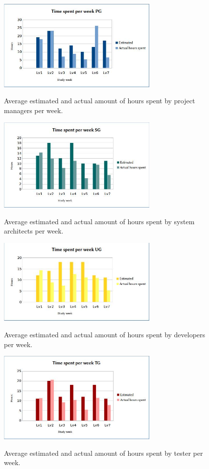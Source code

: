 \documentclass[a4paper]{article}
\begin{document}
\begin{figure}[h!]
\centering
\includegraphics[width=0.7\textwidth]{pg.jpg}
\label{fig:pg}
\caption{Average estimated and actual amount of hours spent by project managers per week.}
\end{figure}

\begin{figure}[h!]
\centering
\includegraphics[width=0.7\textwidth]{sg.jpg}
\label{fig:sg}
\caption{Average estimated and actual amount of hours spent by system architects per week.}
\end{figure}

\begin{figure}[h!]
\centering
\includegraphics[width=0.7\textwidth]{ug.jpg}
\label{fig:ug}
\caption{Average estimated and actual amount of hours spent by developers per week.}
\end{figure}

\begin{figure}[h!]
\centering
\includegraphics[width=0.7\textwidth]{tg.jpg}
\label{fig:tg}
\caption{Average estimated and actual amount of hours spent by tester per week.}
\end{figure}
\end{document}

